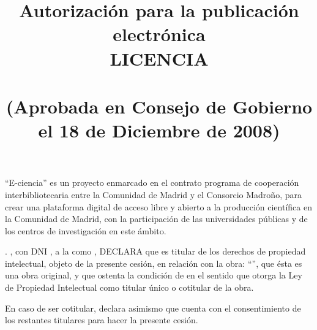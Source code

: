 
   
                                   
    

   


\title{Autorización \mybookDelOrDeLa{} \mybookAutorOrAutora{} para la publicación
electrónica \\ LICENCIA\\~\\ \large(Aprobada en Consejo de Gobierno el 18 de Diciembre de 2008)} 
           
\date{} 


\maketitle 

\thispagestyle{empty}



``E-ciencia'' es un proyecto enmarcado en el contrato programa de cooperación
interbibliotecaria entre la Comunidad de Madrid y el Consorcio Madroño, para crear una
plataforma digital de acceso libre y abierto a la producción científica en la Comunidad de
Madrid, con la participación de las universidades públicas y de los centros de
investigación en este ámbito.

\expandafter\makefirstuc\expandafter{\mybookElOrLa}
\mybookAutorOrAutora{} \mybookDonOrDona{}. \mybookauthor, con DNI
\mybookDNIOpenPublishing, \mybookAdscritoOrAdscrita{} a la
\mybookuniversity{} como \mybookAlumnoOrAlumna, DECLARA que es \mybookElOrLa{} titular de los
derechos de propiedad intelectual, objeto de la presente cesión, en
relación con la obra: ``\mybooktitle'', que ésta es una obra original, y
que ostenta la condición de \mybookAutorOrAutora{} en el sentido que
otorga la Ley de Propiedad Intelectual como titular único o cotitular de
la obra.

En caso de ser cotitular, \mybookElOrLa{} \mybookAutorOrAutora{} declara
asimismo que cuenta con el consentimiento de los restantes titulares
para hacer la presente cesión.

